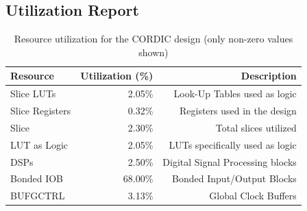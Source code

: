 \subsection{Utilization Report}
\begin{table}[H]
    \centering
    \small
    \captionsetup{skip=10pt} 
    \begin{tabular}{lrr}
        \hline
        Resource               & Utilization (\%) & Description \\
        \hline
        Slice LUTs             & 2.05\%           & Look-Up Tables used as logic \\
        Slice Registers        & 0.32\%           & Registers used in the design \\
        Slice                  & 2.30\%           & Total slices utilized \\
        LUT as Logic           & 2.05\%           & LUTs specifically used as logic \\
        DSPs                   & 2.50\%           & Digital Signal Processing blocks \\
        Bonded IOB             & 68.00\%          & Bonded Input/Output Blocks \\
        BUFGCTRL               & 3.13\%           & Global Clock Buffers \\
        \hline
    \end{tabular}
    \caption{Resource utilization for the CORDIC design (only non-zero values shown)}
    \label{tab:cordic_resource_utilization}
\end{table}


